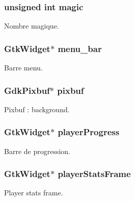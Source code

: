\subsubsection[{\texorpdfstring{magic}{magic}}]{\setlength{\rightskip}{0pt plus 5cm}unsigned int magic}\hypertarget{struct_mydata_a7154179fe070a40c828f7c03f454d4d6}{}\label{struct_mydata_a7154179fe070a40c828f7c03f454d4d6}
Nombre magique. 
\subsubsection[{\texorpdfstring{menu\+\_\+bar}{menu_bar}}]{\setlength{\rightskip}{0pt plus 5cm}Gtk\+Widget$\ast$ menu\+\_\+bar}\hypertarget{struct_mydata_ad2f34f578fffe42cf2686e61f2dd85bf}{}\label{struct_mydata_ad2f34f578fffe42cf2686e61f2dd85bf}
Barre menu. 
\subsubsection[{\texorpdfstring{pixbuf}{pixbuf}}]{\setlength{\rightskip}{0pt plus 5cm}Gdk\+Pixbuf$\ast$ pixbuf}\hypertarget{struct_mydata_a44cf4bc3a3a7376477b86bae6580de08}{}\label{struct_mydata_a44cf4bc3a3a7376477b86bae6580de08}
Pixbuf \+: background. 
\subsubsection[{\texorpdfstring{player\+Progress}{playerProgress}}]{\setlength{\rightskip}{0pt plus 5cm}Gtk\+Widget$\ast$ player\+Progress}\hypertarget{struct_mydata_a8f7df3b38dd2aa1d9d7e1bf4276c1d53}{}\label{struct_mydata_a8f7df3b38dd2aa1d9d7e1bf4276c1d53}
Barre de progression. 
\subsubsection[{\texorpdfstring{player\+Stats\+Frame}{playerStatsFrame}}]{\setlength{\rightskip}{0pt plus 5cm}Gtk\+Widget$\ast$ player\+Stats\+Frame}\hypertarget{struct_mydata_ad9fd4a843722e81542171abbef74f968}{}\label{struct_mydata_ad9fd4a843722e81542171abbef74f968}
Player stats frame. 
